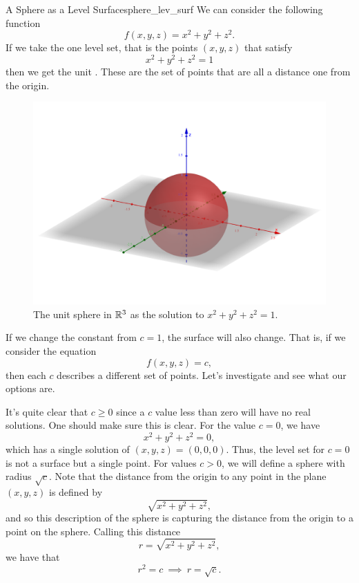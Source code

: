                 \begin{ex}{A Sphere as a Level Surface}{sphere_lev_surf}
                We can consider the following function
                \[
                f(x,y,z)=x^2+y^2+z^2.
                \]
                If we take the one level set, that is the points $(x,y,z)$ that satisfy
                \[
                x^2+y^2+z^2=1
                \]
                then we get the unit .  These are the set of points that are all a distance one from the origin.
              	\begin{figure}[H]
              		\centering
              		\includegraphics[width=.8\textwidth]{Figures_Part_6/Sphere.png}
              		\caption{The unit sphere in $\mathbb{R}^3$ as the solution to $x^2+y^2+z^2=1$.}
              	\end{figure}

              	If we change the constant from $c=1$, the surface will also change.  That is, if we consider the equation
              	\[
              	f(x,y,z)=c,
              	\]
              	then each $c$ describes a different set of points.  Let's investigate and see what our options are.

              	It's quite clear that $c\geq 0$ since a $c$ value less than zero will have no real solutions.  One should make sure this is clear.  For the value $c=0$, we have
              	\[
              	x^2+y^2+z^2=0,
              	\]
              	which has a single solution of $(x,y,z)=(0,0,0)$.  Thus, the level set for $c=0$ is not a surface but a single point.  For values $c>0$, we will define a sphere with radius $\sqrt{c}$.  Note that the distance from the origin to any point in the plane $(x,y,z)$ is defined by
              	\[
              	\sqrt{x^2+y^2+z^2},
              	\]
              	and so this description of the sphere is capturing the distance from the origin to a point on the sphere.  Calling this distance
              	\[
              	r=\sqrt{x^2+y^2+z^2},
              	\]
              	we have that
              	\[
              	r^2 = c ~ \implies~ r = \sqrt{c}.
              	\]
                \end{ex}

